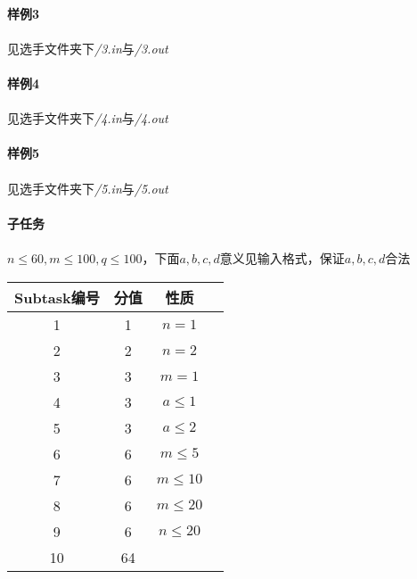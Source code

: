 \documentclass[UTF8]{ctexart}
\begin{document}
\paragraph{样例3}
\paragraph{}见选手文件夹下\emph{/3.in}与\emph{/3.out}
\paragraph{样例4}
\paragraph{}见选手文件夹下\emph{/4.in}与\emph{/4.out}
\paragraph{样例5}
\paragraph{}见选手文件夹下\emph{/5.in}与\emph{/5.out}
\paragraph{子任务}
\paragraph{}$n\le 60,m\le 100,q\le 100$，下面$a,b,c,d$意义见输入格式，保证$a,b,c,d$合法
\begin{center}
	\begin{tabular}{|c|c|c|c|}
		\hline
		Subtask编号&分值&性质\\
		\hline
		1&1&$n=1$\\
		\hline
		2&2&$n=2$\\
		\hline
		3&3&$m=1$\\
		\hline
		4&3&$a\le 1$\\
		\hline
		5&3&$a\le 2$\\
		\hline
		6&6&$m\le 5$\\
		\hline
		7&6&$m\le 10$\\
		\hline
		8&6&$m\le 20$\\
		\hline
		9&6&$n\le 20$\\
		\hline
		10&64&\\
		\hline
	\end{tabular}	
\end{center}
\clearpage
\end{document}
